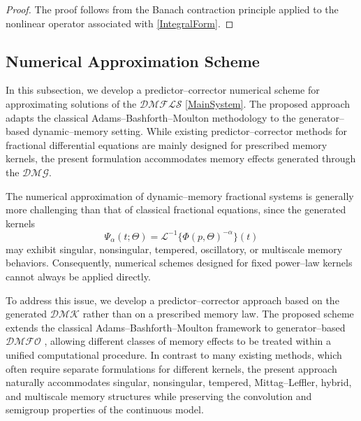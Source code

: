 \documentclass[11pt]{article}
\numberwithin{equation}{section}
\begin{document}
\begin{proof}
The proof follows from the Banach contraction principle applied to the nonlinear operator associated with \eqref{IntegralForm}.
\end{proof}

\subsection{Numerical Approximation Scheme}

In this subsection, we develop a predictor--corrector numerical scheme for approximating solutions of the $\mathcal{DMFLS}$ \eqref{MainSystem}. The proposed approach adapts the classical Adams--Bashforth--Moulton methodology to the generator--based dynamic--memory setting. While existing predictor--corrector methods for fractional differential equations \cite{Diethelm2002,Garrappa2015} are mainly designed for prescribed memory kernels, the present formulation accommodates memory effects generated through the $\mathcal{DMG}$.

The numerical approximation of dynamic--memory fractional systems is generally
more challenging than that of classical fractional equations, since the generated
kernels
\[
\Psi_\alpha(t;\Theta)
=
\mathcal L^{-1}
\{
\Phi(p,\Theta)^{-\alpha}
\}(t)
\]
may exhibit singular, nonsingular, tempered, oscillatory, or multiscale memory
behaviors. Consequently, numerical schemes designed for fixed power--law kernels
cannot always be applied directly.

To address this issue, we develop a predictor--corrector approach based on the
generated $\mathcal{DMK}$ rather than on a prescribed memory law. The proposed
scheme extends the classical Adams--Bashforth--Moulton framework to generator--based
$\mathcal{DMFO}$ , allowing different classes of memory effects to be treated
within a unified computational procedure. In contrast to many existing methods,
which often require separate formulations for different kernels, the present approach
naturally accommodates singular, nonsingular, tempered, Mittag--Leffler, hybrid, and
multiscale memory structures while preserving the convolution and semigroup properties
of the continuous model.
\end{document}
